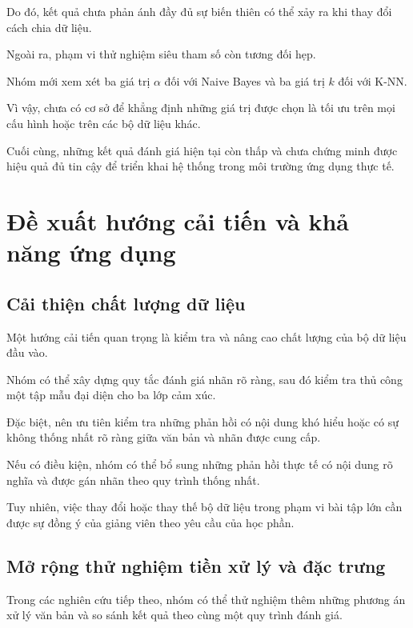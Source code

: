 Do đó, kết quả chưa phản ánh
đầy đủ sự biến thiên có thể xảy
ra khi thay đổi cách chia dữ liệu.

Ngoài ra, phạm vi thử nghiệm
siêu tham số còn tương đối hẹp.

Nhóm mới xem xét ba giá trị $\alpha$
đối với Naive Bayes và ba giá trị
$k$ đối với K-NN.

Vì vậy, chưa có cơ sở để khẳng
định những giá trị được chọn
là tối ưu trên mọi cấu hình
hoặc trên các bộ dữ liệu khác.

Cuối cùng, những kết quả đánh giá
hiện tại còn thấp và chưa chứng
minh được hiệu quả đủ tin cậy
để triển khai hệ thống trong
môi trường ứng dụng thực tế.



\section{Đề xuất hướng cải tiến và khả năng ứng dụng}

\subsection{Cải thiện chất lượng dữ liệu}

Một hướng cải tiến quan trọng là
kiểm tra và nâng cao chất lượng
của bộ dữ liệu đầu vào.

Nhóm có thể xây dựng quy tắc
đánh giá nhãn rõ ràng, sau đó
kiểm tra thủ công một tập mẫu
đại diện cho ba lớp cảm xúc.

Đặc biệt, nên ưu tiên kiểm tra
những phản hồi có nội dung
khó hiểu hoặc có sự không
thống nhất rõ ràng giữa
văn bản và nhãn được cung cấp.

Nếu có điều kiện, nhóm có thể
bổ sung những phản hồi thực tế
có nội dung rõ nghĩa và được
gán nhãn theo quy trình thống nhất.

Tuy nhiên, việc thay đổi hoặc
thay thế bộ dữ liệu trong phạm
vi bài tập lớn cần được sự
đồng ý của giảng viên theo
yêu cầu của học phần.


\subsection{Mở rộng thử nghiệm tiền xử lý và đặc trưng}

Trong các nghiên cứu tiếp theo,
nhóm có thể thử nghiệm thêm
những phương án xử lý văn bản
và so sánh kết quả theo cùng
một quy trình đánh giá.

